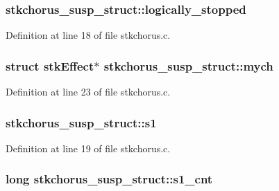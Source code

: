 \subsubsection[{\texorpdfstring{logically\+\_\+stopped}{logically_stopped}}]{ stkchorus\+\_\+susp\+\_\+struct\+::logically\+\_\+stopped}\hypertarget{structstkchorus__susp__struct_a0c0768ec2fa080f81cec92febde967b6}{}\label{structstkchorus__susp__struct_a0c0768ec2fa080f81cec92febde967b6}


Definition at line 18 of file stkchorus.\+c.

\subsubsection[{\texorpdfstring{mych}{mych}}]{\setlength{\rightskip}{0pt plus 5cm}struct {\bf stk\+Effect}$\ast$ stkchorus\+\_\+susp\+\_\+struct\+::mych}\hypertarget{structstkchorus__susp__struct_a7f91686837ebebcd05085a6684ef8a66}{}\label{structstkchorus__susp__struct_a7f91686837ebebcd05085a6684ef8a66}


Definition at line 23 of file stkchorus.\+c.

\subsubsection[{\texorpdfstring{s1}{s1}}]{ stkchorus\+\_\+susp\+\_\+struct\+::s1}\hypertarget{structstkchorus__susp__struct_ac74d095a4a94b1277826782e9185a1a5}{}\label{structstkchorus__susp__struct_ac74d095a4a94b1277826782e9185a1a5}


Definition at line 19 of file stkchorus.\+c.

\subsubsection[{\texorpdfstring{s1\+\_\+cnt}{s1_cnt}}]{\setlength{\rightskip}{0pt plus 5cm}long stkchorus\+\_\+susp\+\_\+struct\+::s1\+\_\+cnt}\hypertarget{structstkchorus__susp__struct_a66f88779ec90e710a39a07674fa96e96}{}\label{structstkchorus__susp__struct_a66f88779ec90e710a39a07674fa96e96}


